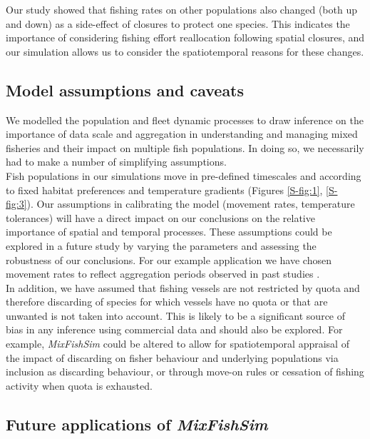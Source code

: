 \documentclass[preprint]{elsarticle}
\begin{document}
Our study showed that fishing rates on other populations also changed (both up
and down) as a side-effect of closures to protect one species. This indicates
the importance of considering fishing effort reallocation following spatial
closures, and our simulation allows us to consider the spatiotemporal reasons
for these changes.

\subsection{Model assumptions and caveats}

We modelled the population and fleet dynamic processes to draw inference on the
importance of data scale and aggregation in understanding and managing mixed
fisheries and their impact on multiple fish populations. In doing so, we
necessarily had to make a number of simplifying assumptions. \\

Fish populations in our simulations move in pre-defined timescales and
according to fixed habitat preferences and temperature gradients (Figures
\ref{S-fig:1}, \ref{S-fig:3}). Our assumptions in calibrating the model
(movement rates, temperature tolerances) will have a direct impact on our
conclusions on the relative importance of spatial and temporal processes. These
assumptions could be explored in a future study by varying the parameters and
assessing the robustness of our conclusions. For our example application we
have chosen movement rates to reflect aggregation periods observed in past
studies \citep{Poos2007}. \\

In addition, we have assumed that fishing vessels are not restricted by quota
and therefore discarding of species for which vessels have no quota or that are
unwanted is not taken into account. This is likely to be a significant source
of bias in any inference using commercial data and should also be explored. For
example, \textit{MixFishSim} could be altered to allow for spatiotemporal
appraisal of the impact of discarding on fisher behaviour and underlying
populations via inclusion as discarding behaviour, or through move-on rules or
cessation of fishing activity when quota is exhausted. \\

\subsection{Future applications of \textit{MixFishSim}}
\end{document}
